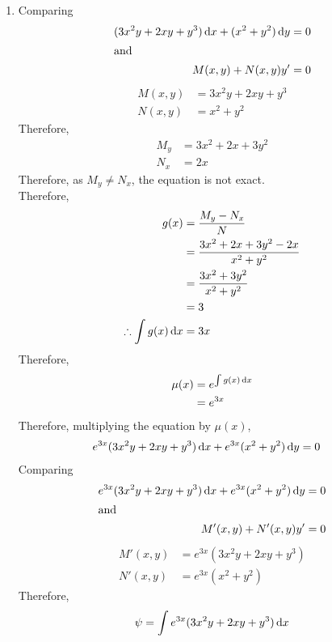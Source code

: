 \documentclass[fleqn, a4paper, 12pt, oneside]{amsart}
\theoremstyle{definition}
\theoremstyle{theorem}
\begin{document}
\begin{solution}
	\begin{enumerate}[leftmargin=*]
		\item
			Comparing
			\begin{align*}
				(3 x^2 y + 2 x y + y^3) \dif x + (x^2 + y^2) \dif y &= 0\\
				\intertext{and}
				M(x,y) + N(x,y) y' &= 0
			\end{align*}
			\begin{align*}
				M(x,y) &= 3 x^2 y + 2 x y + y^3\\
				N(x,y) &= x^2 + y^2
			\end{align*}
			Therefore,
			\begin{align*}
				M_y &= 3 x^2 + 2 x + 3 y^2\\
				N_x &= 2 x
			\end{align*}
			Therefore, as $M_y \neq N_x$, the equation is not exact.\\
			Therefore,
			\begin{align*}
				g(x) &= \dfrac{M_y - N_x}{N}\\
				&= \dfrac{3 x^2 + 2 x + 3 y^2 - 2 x}{x^2 + y^2}\\
				&= \dfrac{3 x^2 + 3 y^2}{x^2 + y^2}\\
				&= 3\\
				\therefore \int g(x) \dif x &= 3 x
			\end{align*}
			Therefore,
			\begin{align*}
				\mu(x) &= e^{\int g(x) \dif x}\\
				&= e^{3 x}
			\end{align*}
			Therefore, multiplying the equation by $\mu(x)$,
			\begin{align*}
				e^{3 x} (3 x^2 y + 2 x y + y^3) \dif x + e^{3 x} (x^2 + y^2) \dif y &= 0
			\end{align*}
			Comparing
			\begin{align*}
				e^{3 x} (3 x^2 y + 2 x y + y^3) \dif x + e^{3 x} (x^2 + y^2) \dif y &= 0\\
				\intertext{and}
				M'(x,y) + N'(x,y) y' &= 0
			\end{align*}
			\begin{align*}
				M'(x,y) &= e^{3 x} (3 x^2 y + 2 x y + y^3)\\
				N'(x,y) &= e^{3 x} (x^2 + y^2)
			\end{align*}
			Therefore,
			\begin{align*}
				\psi &= \int e^{3 x} (3 x^2 y + 2 x y + y^3) \dif x\\

\end{align*}
\end{enumerate}
\end{solution}
\end{document}
